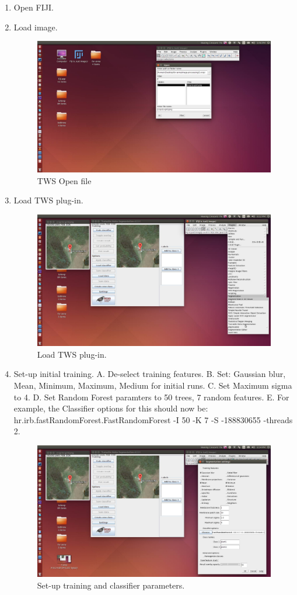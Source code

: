 \documentclass[letterpaper]{article}
\begin{document}
\begin{enumerate}
\item Open FIJI.
\item Load image.
\begin{figure}[htps!]
\centering
\includegraphics[width=0.7\linewidth]{../e-tws/1}
\caption{TWS Open file}
\label{fig:2}
\end{figure}
\clearpage

\item Load TWS plug-in.
\begin{figure}[htps!]
\centering
\includegraphics[width=0.7\linewidth]{../e-tws/2}
\caption{Load TWS plug-in.}
\label{fig:3}
\end{figure}

\item Set-up initial training.
\subitem A. De-select training features.
\subitem B. Set: Gaussian blur, Mean, Minimum, Maximum, Medium for initial runs.
\subitem C. Set Maximum sigma to 4.
\subitem D. Set Random Forest paramters to 50 trees, 7 random features.
\subitem E. For example, the Classifier options for this should now be:  hr.irb.fastRandomForest.FastRandomForest 
\subitem -I 50 -K 7 -S -188830655 -threads 2.

\begin{figure}[htps!]
\centering
\includegraphics[width=0.7\linewidth]{../e-tws/3}
\caption{Set-up training and classifier parameters.}
\label{fig:4}
\end{figure}


\end{enumerate}
\end{document}
